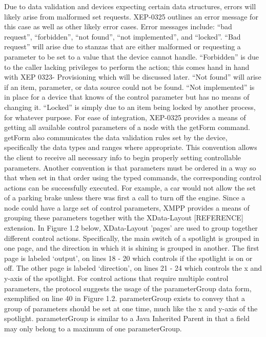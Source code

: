 Due to data validation and devices expecting certain data structures, errors will likely arise from malformed set requests. XEP-0325 outlines an error message for this case as well as other likely error cases. Error messages include:  ``bad request'',  ``forbidden'',  ``not found'',  ``not implemented'', and  ``locked''.  ``Bad request'' will arise due to stanzas that are either malformed or requesting a parameter to be set to a value that the device cannot handle.  ``Forbidden'' is due to the caller lacking privileges to perform the action; this comes hand in hand with XEP 0323- Provisioning which will be discussed later.  ``Not found'' will arise if an item, parameter, or data source could not be found.  ``Not implemented'' is in place for a device that knows of the control parameter but has no means of changing it.  ``Locked'' is simply due to an item being locked by another process, for whatever purpose.
For ease of integration, XEP-0325 provides a means of getting all available control parameters of a node with the getForm command. getForm also communicates the data validation rules set by the device, specifically the data types and ranges where appropriate. This convention allows the client to receive all necessary info to begin properly setting controllable parameters. Another convention is that parameters must be ordered in a way so that when set in that order using the typed commands, the corresponding control actions can be successfully executed. For example, a car would not allow the set of a parking brake unless there was first a call to turn off the engine. 
Since a node could have a large set of control parameters, XMPP provides a means of grouping these parameters together with the XData-Layout [REFERENCE] extension. In Figure 1.2 below, XData-Layout 'pages' are used to group together different control actions. Specifically, the main switch of a spotlight is grouped in one page, and the direction in which it is shining is grouped in another. The first page is labeled ‘output’, on lines 18 - 20 which controls if the spotlight is on or off. The other page is labeled ‘direction’, on lines 21 - 24 which controls the x and y-axis of the spotlight.
For control actions that require multiple control parameters, the protocol suggests the usage of the parameterGroup data form, exemplified on line 40 in Figure 1.2. parameterGroup exists to convey that a group of parameters should be set at one time, much like the x and y-axis of the spotlight. parameterGroup is similar to a Java Inherited Parent in that a field may only belong to a maximum of one parameterGroup. 


